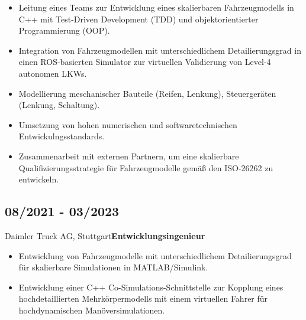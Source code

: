 \documentclass{classic}
\begin{document}
\begin{paracol}{2}
{\begin{itemize}
            \item Leitung eines Teams zur Entwicklung eines skalierbaren
                Fahrzeugmodells in C++ mit Test-Driven Development (TDD) und
                objektorientierter Programmierung (OOP).

            \item Integration von Fahrzeugmodellen mit unterschiedlichem
                Detailierungsgrad in einen ROS-basierten Simulator zur
                virtuellen Validierung von Level-4 autonomen LKWs.
            
            \item Modellierung meschanischer Bauteile (Reifen, Lenkung),
                Steuerger{\"a}ten (Lenkung, Schaltung).

            \item Umsetzung von hohen numerischen und softwaretechnischen
                Entwickulngsstandards. 

            \item Zusammenarbeit mit externen Partnern, um eine skalierbare
                Qualifizierungsstrategie für Fahrzeugmodelle gem{\"a}{\ss} den
                ISO-26262 zu entwickeln.

          \end{itemize}
     
          \subsection{08/2021 - 03/2023}{Daimler Truck AG, Stuttgart}{{\bfseries Entwicklungsingenieur}}
           \begin{itemize}
               \item Entwicklung von Fahrzeugmodelle mit unterschiedlichem
                   Detailierungsgrad f{\"u}r skalierbare Simulationen in MATLAB/Simulink.

               \item Entwicklung einer C++ Co-Simulations-Schnittstelle zur
                   Kopplung eines hochdetaillierten Mehrk{\"o}rpermodells mit
                   einem virtuellen Fahrer für hochdynamischen
                   Man{\"o}versimulationen.
           \end{itemize}

}
\end{paracol}
\end{document}
